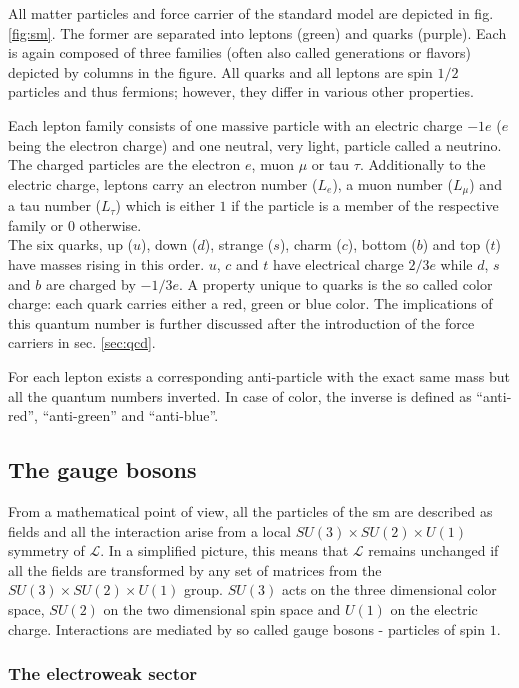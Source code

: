 All matter particles and force carrier of the standard model are depicted in fig. \ref{fig:sm}. The former are separated into leptons (green) and quarks (purple). Each is again composed of three families (often also called generations or flavors) depicted by columns in the figure. All quarks and all leptons are spin $1/2$ particles and thus fermions; however, they differ in various other properties.


Each lepton family consists of one massive particle with an electric charge $-1e$ ($e$ being the electron charge) and one neutral, very light, particle called a neutrino. The charged particles are the electron $e$, muon $\mu$ or tau $\tau$. Additionally to the electric charge, leptons carry an electron number ($L_e$), a muon number ($L_\mu$) and a tau number ($L_\tau$) which is either $1$ if the particle is a member of the respective family or $0$ otherwise.\\

The six quarks, up ($u$), down ($d$), strange ($s$), charm ($c$), bottom ($b$) and top ($t$) have masses rising in this order. $u$, $c$ and $t$ have electrical charge $2/3e$ while $d$, $s$ and $b$ are charged by $-1/3e$. A property unique to quarks is the so called color charge: each quark carries either a red, green or blue color. The implications of this quantum number is further discussed after the introduction of the force carriers in sec. \ref{sec:qcd}. 

For each lepton exists a corresponding anti-particle with the exact same mass but all the quantum numbers inverted. In case of color, the inverse is defined as ``anti-red'', ``anti-green'' and ``anti-blue''.

\subsection{The gauge bosons}
\label{sec:gauge-bosons}
From a mathematical point of view, all the particles of the \gls{sm} are described as fields and all the interaction arise from a local $SU(3)\times SU(2) \times U(1)$ symmetry of $\mathcal{L}$. In a simplified picture, this means that $\mathcal{L}$ remains unchanged if all the fields are transformed by any set of matrices from the $SU(3)\times SU(2) \times U(1)$ group. $SU(3)$ acts on the three dimensional color space, $SU(2)$ on the two dimensional spin space and $U(1)$ on the electric charge. Interactions are mediated by so called gauge bosons - particles of spin $1$.

\subsubsection{The electroweak sector}
\label{sec:qed}

